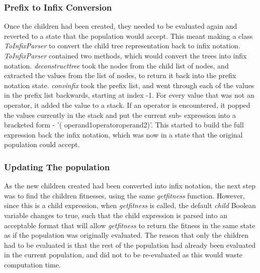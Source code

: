 \documentclass[11pt]{article}
\begin{document}
\subsubsection{Prefix to Infix Conversion}\label{subsubsec:P2I}
Once the children had been created, they needed to be evaluated again and reverted to a state that the population would accept. This meant making a class \textit{ToInfixParser} to convert the child tree representation back to infix notation. 
\textit{ToInfixParser} contained two methods, which would convert the trees into infix notation. \textit{deconstruct\textunderscore tree} took the nodes from the child list of nodes, and extracted the values from the list of nodes, to return it back into the prefix notation state. 
\textit{conv\textunderscore infix} took the prefix list, and went through each of the values in the prefix list backwards, starting at index -1. For every value that was not an operator, it added the value to a stack. If an operator is encountered, it popped the values currently in the stack and put the current sub- expression into a bracketed form - '( \textlangle{}operand1\textrangle{}\textlangle{}operator\textrangle{}\textlangle{}operand2\textrangle{})'. This started to build the full expression back the infix notation, which was now in a state that the original population could accept.
\subsubsection{Updating The population}\label{subsubsec:UP}
As the new children created had been converted into infix notation, the next step was to find the children fitnesses, using the same \textit{get\textunderscore fitness} function. However,  since this is a child expression, when \textit{get\textunderscore fitness} is called, the default \textit{child} Boolean variable changes to true, such that the child expression is parsed into an acceptable format that will allow \textit{get\textunderscore fitness} to return the fitness in the same state as if the population was originally evaluated. The reason that only the children had to be evaluated is that the rest of the population had already been evaluated in the current population, and did not to be re-evaluated as this would waste computation time.  \\
\end{document}
